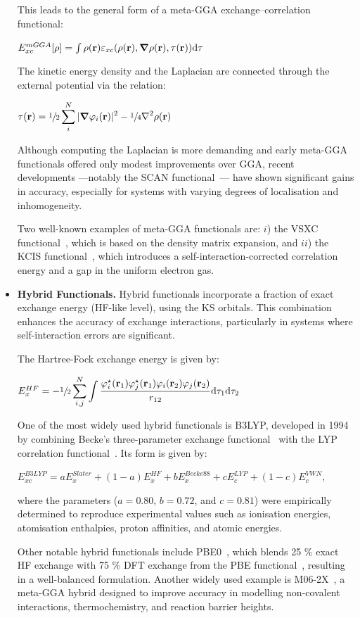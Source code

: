 \begin{itemize}
  This leads to the general form of a meta-GGA exchange--correlation
  functional:

  $E_{xc}^{mGGA} [\rho] =
    \int\rho(\mathbf{r}) \varepsilon_{xc}(\rho(\mathbf{r}), \boldsymbol{\nabla}\rho(\mathbf{r}), \tau(\mathbf{r})) \dd\tau$

  The kinetic energy density and the Laplacian are connected through the
  external potential via the relation:

  $\tau(\mathbf{r}) = \sfrac{1}{2}\displaystyle\sum_i^N |\boldsymbol{\nabla}\varphi_i(\mathbf{r})|^2
    - \sfrac{1}{4} \nabla^2\rho(\mathbf{r})$

  Although computing the Laplacian is more demanding and early meta-GGA
  functionals offered only modest improvements over \gls{GGA}, recent developments
  ---notably the SCAN functional~\cite{scan}--- have shown significant gains in
  accuracy, especially for systems with varying degrees of localisation and
  inhomogeneity.

  Two well-known examples of meta-GGA functionals are: $i$) the VSXC
  functional~\cite{VanVoorhis1998}, which is based on the density matrix
  expansion, and $ii$) the KCIS functional~\cite{kcis1999}, which introduces a
  self-interaction-corrected correlation energy and a gap in the uniform electron
  gas.

  \newpage
  \item \textbf{Hybrid Functionals.} Hybrid functionals incorporate a fraction of
  exact exchange energy (\gls{HF}-like level), using the
  \gls{KS} orbitals. This combination enhances the accuracy of exchange
  interactions, particularly in systems where self-interaction errors are
  significant.

  The Hartree-Fock exchange energy is given by:

  $E_x^{HF} = -\sfrac{1}{2}\displaystyle\sum_{i,j}^N\displaystyle\int
  \displaystyle\frac{\varphi_{i}^{\star}(\mathbf{r}_1)
    \varphi_j^{\star}(\mathbf{r}_1) \varphi_i(\mathbf{r}_2) \varphi_j(\mathbf{r}_2)}
    {r_{12}} \dd\tau_1 \dd\tau_2$

  One of the most widely used hybrid functionals is B3LYP, developed in 1994 by
  combining Becke's three-parameter exchange functional~\cite{Becke1993} with the
  LYP correlation functional~\cite{Lee1988}. Its form is given by:

  $E_{xc}^{B3LYP} = aE_{x}^{Slater} + (1-a)E_x^{HF} +bE_x^{Becke88}
  +cE_c^{LYP} + (1-c)E_c^{VWN}$,

  where the parameters ($a = 0.80$, $b = 0.72$, and $c = 0.81$) were empirically
  determined to reproduce experimental values such as ionisation energies,
  atomisation enthalpies, proton affinities, and atomic energies.

  Other notable hybrid functionals include PBE0~\cite{Adamo1999}, which blends
  25 \% exact \gls{HF} exchange with 75 \% \gls{DFT} exchange from the
  PBE functional~\cite{Ernzerhof1998}, resulting in a well-balanced formulation.
  Another widely used example is M06-2X~\cite{Zhao2007}, a meta-GGA hybrid
  designed to improve accuracy in modelling non-covalent interactions,
  thermochemistry, and reaction barrier heights.

\end{itemize}

